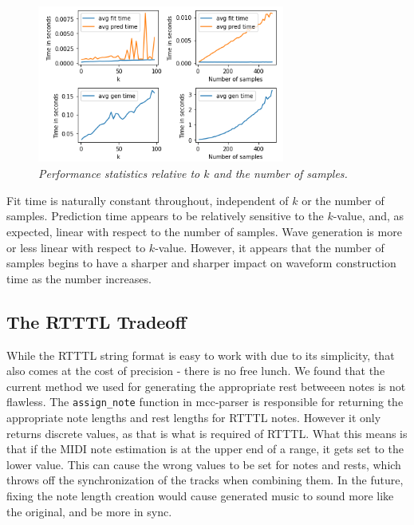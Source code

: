 \documentclass{article}
\begin{document}
\begin{figure} 
\includegraphics[width=230pt]{figs/stats.png} 
\caption{\small \sl Performance statistics relative to $k$ and the number of samples.\label{fig:stats}} 
\end{figure}

Fit time is naturally constant throughout, independent of $k$ or the number of samples. Prediction time appears to be relatively sensitive to the $k$-value, and, as expected, 
linear with respect to the number of samples. Wave generation is more or less linear with respect to $k$-value. However, it appears that the number of samples begins to have 
a sharper and sharper impact on waveform construction time as the number increases.

\subsection{The RTTTL Tradeoff}
While the RTTTL string format is easy to work with due to its simplicity, that also comes at the cost of precision - there is no free lunch. We found that the current method 
we used for generating the appropriate rest betweeen notes is not flawless. The \texttt{assign\_note} function in mcc-parser is responsible for returning the appropriate note 
lengths and rest lengths for RTTTL notes. However it only returns discrete values, as that is what is required of RTTTL. What this means is that if the MIDI note estimation is 
at the upper end of a range, it gets set to the lower value. This can cause the wrong values to be set for notes and rests, which throws off the synchronization of the tracks 
when combining them. In the future, fixing the note length creation would cause generated music to sound more like the original, and be more in sync.
\end{document}
